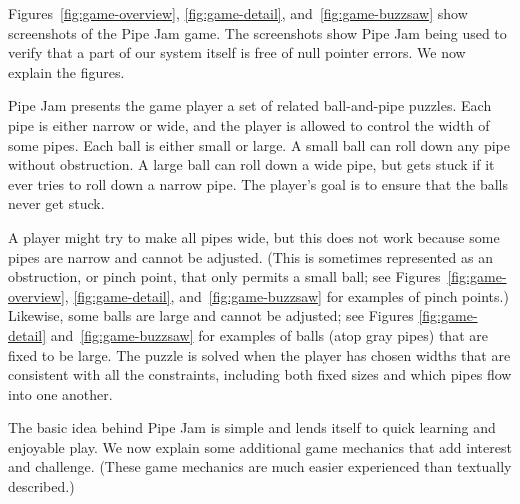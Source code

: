 \documentclass[preprint]{sig-alternate}
\begin{document}
Figures~\ref{fig:game-overview}, \ref{fig:game-detail},
and~\ref{fig:game-buzzsaw} show screenshots of the Pipe Jam game.  The
screenshots show Pipe Jam being used to verify that a part of our system
itself is free of null pointer errors.  We now explain the figures.

Pipe Jam presents the game player a set of related ball-and-pipe
puzzles.  Each pipe is either narrow or wide, and the player is
allowed to control the width of some pipes.  Each ball is either small
or large.  A small ball can roll down any pipe without obstruction.  A
large ball can roll down a wide pipe, but gets stuck if it ever tries
to roll down a narrow pipe.  The player's goal is to ensure that the
balls never get stuck.

A player might try to make all pipes wide, but this does not work
because some pipes are narrow and cannot be adjusted.  (This is
sometimes represented as an obstruction, or pinch point, that only
permits a small ball; see Figures~\ref{fig:game-overview},
\ref{fig:game-detail}, and~\ref{fig:game-buzzsaw} for examples of
pinch points.)  Likewise, some balls are large and cannot be adjusted;
see Figures \ref{fig:game-detail} and~\ref{fig:game-buzzsaw} for
examples of balls (atop gray pipes) that are fixed to be large.  The
puzzle is solved when the player has chosen widths that are consistent
with all the constraints, including both fixed sizes and which pipes
flow into one another.

The basic idea behind Pipe Jam is simple and lends itself to quick
learning and enjoyable play.  We now explain some additional game
mechanics that add interest and challenge.  (These game mechanics are
much easier experienced than textually described.)
\end{document}
